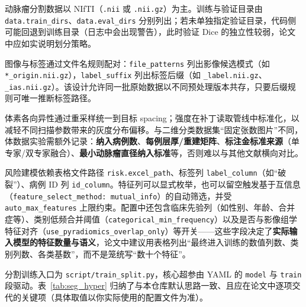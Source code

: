 动脉瘤分割数据以 NIfTI（\texttt{.nii} 或 \texttt{.nii.gz}）为主。训练与验证目录由 \texttt{data.train\_dirs}、\texttt{data.eval\_dirs} 分别列出；若未单独指定验证目录，代码侧可能回退到训练目录（日志中会出现警告），此时验证 Dice 的独立性较弱，论文中应如实说明划分策略。

图像与标签通过文件名规则配对：\texttt{file\_patterns} 列出影像候选模式（如 \texttt{*\_origin.nii.gz}），\texttt{label\_suffix} 列出标签后缀（如 \texttt{\_label.nii.gz}、\texttt{\_ias.nii.gz}）。该设计允许同一批原始数据以不同预处理版本共存，只要后缀规则可唯一推断标签路径。

体素各向异性通过重采样统一到目标 spacing；强度在补丁读取管线中标准化，以减轻不同扫描参数带来的灰度分布偏移。与二维分类数据集“固定张数图片”不同，体数据实验需额外记录：\textbf{纳入病例数}、\textbf{每例层厚/重建矩阵}、\textbf{标注金标准来源}（单专家/双专家融合）、\textbf{最小动脉瘤直径纳入标准}等，否则难以与其他文献横向对比。

风险建模依赖表格文件路径 \texttt{risk.excel\_path}、标签列 \texttt{label\_column}（如“破裂”）、病例 ID 列 \texttt{id\_column}。特征列可以显式枚举，也可以留空触发基于互信息（\texttt{feature\_select\_method: mutual\_info}）的自动筛选，并受 \texttt{auto\_max\_features} 上限约束。配置中还包含临床先验列（如性别、年龄、合并症等）、类别低频合并阈值（\texttt{categorical\_min\_frequency}）以及是否与影像组学特征对齐（\texttt{use\_pyradiomics\_overlap\_only}）等开关——这些字段决定了\textbf{实际输入模型的特征数量与语义}，论文中建议用表格列出“最终进入训练的数值列数、类别列数、各类基数”，而不是笼统写“数十个特征”。

分割训练入口为 \texttt{script/train\_split.py}，核心超参由 YAML 的 \texttt{model} 与 \texttt{train} 段驱动。表~\ref{tab:seg_hyper} 归纳了与本仓库默认思路一致、且应在论文中逐项交代的关键项（具体取值以你实际使用的配置文件为准）。

